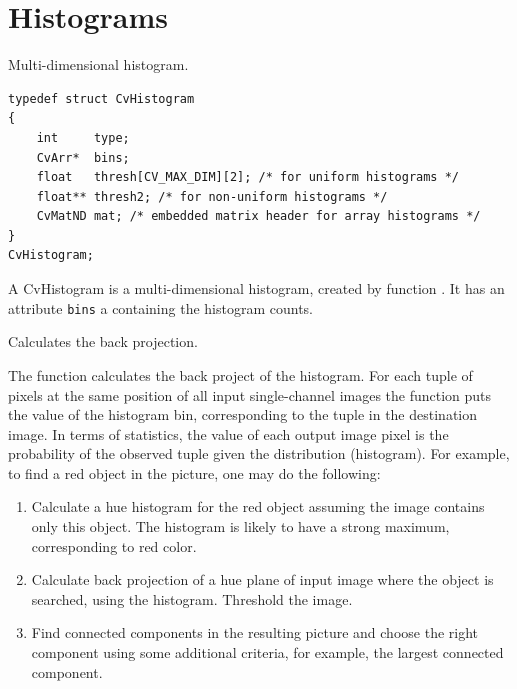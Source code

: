 \section{Histograms}

\ifCPy

\label{CvHistogram}
Multi-dimensional histogram.

\ifC
\begin{lstlisting}
typedef struct CvHistogram
{
    int     type;
    CvArr*  bins;
    float   thresh[CV_MAX_DIM][2]; /* for uniform histograms */
    float** thresh2; /* for non-uniform histograms */
    CvMatND mat; /* embedded matrix header for array histograms */
}
CvHistogram;
\end{lstlisting}
\fi

\ifPy
A CvHistogram is a multi-dimensional histogram, created by function .  It has an attribute \texttt{bins} a  containing the histogram counts.
\fi

Calculates the back projection.


\begin{description}
\end{description}

The function calculates the back project of the histogram. For each
tuple of pixels at the same position of all input single-channel images
the function puts the value of the histogram bin, corresponding to the
tuple in the destination image. In terms of statistics, the value of
each output image pixel is the probability of the observed tuple given
the distribution (histogram). For example, to find a red object in the
picture, one may do the following:

\begin{enumerate}
 \item Calculate a hue histogram for the red object assuming the image contains only this object. The histogram is likely to have a strong maximum, corresponding to red color.
 \item Calculate back projection of a hue plane of input image where the object is searched, using the histogram. Threshold the image.
 \item Find connected components in the resulting picture and choose the right component using some additional criteria, for example, the largest connected component.
\end{enumerate}

